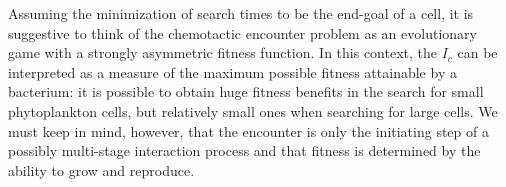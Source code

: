 \documentclass[9pt,twocolumn,twoside]{pnas-new}
\begin{document}




Assuming the minimization of search times to be the end-goal of a cell, it is suggestive to think of the chemotactic encounter problem as an evolutionary game with a strongly asymmetric fitness function.
In this context, the $I_c$ can be interpreted as a measure of the maximum possible fitness attainable by a bacterium: it is possible to obtain huge fitness benefits in the search for small phytoplankton cells, but relatively small ones when searching for large cells. 
We must keep in mind, however, that the encounter is only the initiating step of a possibly multi-stage interaction process and that fitness is determined by the ability to grow and reproduce. %
\end{document}

